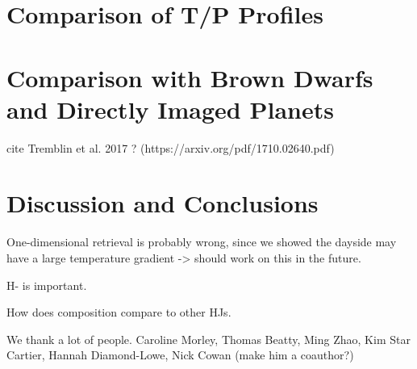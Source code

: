 \documentclass[twocolumn]{aastex61}
\begin{document}
\section{Comparison of T/P Profiles}

\section{Comparison with Brown Dwarfs and Directly Imaged Planets}
cite Tremblin et al. 2017 ? (https://arxiv.org/pdf/1710.02640.pdf)

\section{Discussion and Conclusions}
One-dimensional retrieval is probably wrong, since we showed the dayside may have a large temperature gradient -> should work on this in the future.

H- is important.

How does composition compare to other HJs.

\acknowledgments
We thank a lot of people. Caroline Morley, Thomas Beatty, Ming Zhao, Kim Star Cartier, Hannah Diamond-Lowe, Nick Cowan (make him a coauthor?)



\end{document}
